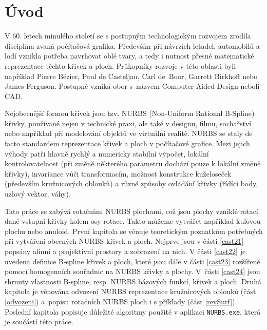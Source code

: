 \chapter*{Úvod}

V 60. letech minulého století se s postupným technologickým rozvojem zrodila disciplína zvaná počítačová grafika. Především při návrzích letadel, automobilů a lodí vznikla potřeba navrhovat oblé tvary, a tedy i nutnost přesné matematické reprezentace těchto křivek a ploch. Průkopníky rozvoje v této oblasti byli například Pierre Bézier, Paul de Casteljau, Carl de~Boor, Garrett Birkhoff nebo James Ferguson. Postupně vzniká obor s~názvem Computer-Aided Design neboli CAD.

Nejobecnější formou křivek jsou tzv. NURBS (Non-Uniform Rational B-Spline) křivky, používané nejen v technické praxi, ale také v designu, filmu, sochařství nebo například při modelování objektů ve virtuální realitě. NURBS se staly de facto standardem reprezentace křivek a ploch v počítačové grafice. Mezi jejich výhody patří hlavně rychlý a numericky stabilní výpočet, lokální kontrolovatelnost (při změně některého parametru dochází pouze k lokální změně křivky), invariance vůči transformacím, možnost konstrukce kuželoseček (především kružnicových oblouků) a různé způsoby ovládání křivky (řídící body, uzlový vektor, váhy).

Tato práce se zabývá rotačními NURBS plochami, což jsou plochy vzniklé rotací dané vstupní křivky kolem osy rotace. Takto můžeme vytvářet například kulovou plochu nebo anuloid. První kapitola se věnuje teoretickým poznatkům potřebných při vytváření obecných NURBS křivek a ploch. Nejprve jsou v části \ref{cast21} popsány afinní a projektivní prostory a zobrazení na nich. V části \ref{cast22} je uvedena definice B-spline křivek a ploch, které jsou dále v části \ref{cast23} rozšířené pomocí homogenních souřadnic na NURBS křivky a plochy. V~části \ref{cast24} jsou shrnuty vlastnosti B-spline, resp. NURBS bázových funkcí, křivek a ploch. Druhá kapitola je věnována odvození NURBS reprezentace kružnicových oblouků (část \ref{odvozeni}) a~popisu rotačních NURBS ploch i s příklady (část \ref{revSurf}). Poslední kapitola popisuje důležité algoritmy použité v aplikaci \texttt{NURBS.exe}, která je součástí této práce.